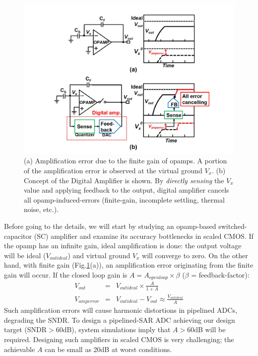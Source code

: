 \begin{figure}
\centering
  \includegraphics[width=1.1\textwidth]{figure/chap2/concept.jpg}
  \caption{(a) Amplification error due to the finite gain of opamps. A portion of the amplification error is observed at the virtual ground $V_x$. (b) Concept of the Digital Amplifier is shown. By \textit{directly sensing} the $V_x$ value and applying feedback to the output, digital amplifier cancels all opamp-induced-errors (finite-gain, incomplete settling, thermal noise, etc.).}
  \label{fig-concept}
\end{figure}

Before going to the details, we will start by studying an opamp-based switched-capacitor (SC) amplifier and examine its accuracy bottlenecks in scaled CMOS. 
If the opamp has an infinite gain, ideal amplification is done: the output voltage will be ideal ($V_{outideal}$) and virtual ground $V_x$ will converge to zero. On the other hand, with finite gain (Fig.\ref{fig-concept}(a)), an amplification error originating from the finite gain will occur. If the closed loop gain is  $A = A_{openloop} \times \beta$ ($\beta$ = feedback-factor):
\begin{eqnarray}
V_{out} &=& V_{outideal} \times \frac{A}{1+A} \\
V_{amperror} &=& V_{outideal} - V_{out} \approx \frac{V_{outideal}}{A}
\end{eqnarray}
Such amplification errors will cause harmonic distortions in pipelined ADCs, degrading the SNDR. To design a pipelined-SAR ADC achieving our design target (SNDR$>$60dB), system simulations imply that $A>$60dB will be required. Designing such amplifiers in scaled CMOS is very challenging; the achievable $A$ can be small as 20dB at worst conditions. 
 
